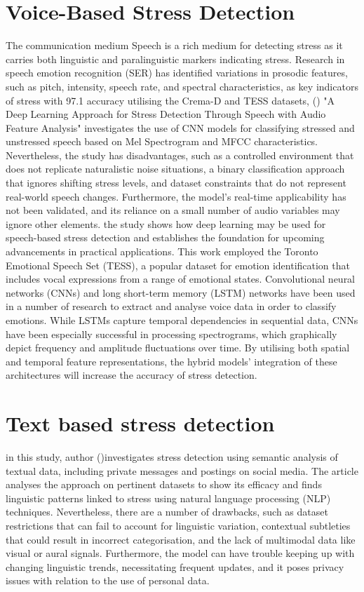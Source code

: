 \documentclass[Arial,12pt,openright,twoside]{book}
\begin{document}
  \section{Voice-Based Stress Detection}
  The communication medium Speech is a rich medium for detecting stress as it carries both linguistic and paralinguistic markers indicating stress. Research in speech emotion recognition (SER) has identified variations in prosodic features, such as pitch, intensity, speech rate, and spectral characteristics, as key indicators of stress with 97.1%
  accuracy utilising the Crema-D and TESS datasets, (\cite{chyan2022}) "A Deep Learning Approach for Stress Detection Through Speech with Audio Feature Analysis" investigates the use of CNN models for classifying stressed and unstressed speech based on Mel Spectrogram and MFCC characteristics. Nevertheless, the study has disadvantages, such as a controlled environment that does not replicate naturalistic noise situations, a binary classification approach that ignores shifting stress levels, and dataset constraints that do not represent real-world speech changes. Furthermore, the model's real-time applicability has not been validated, and its reliance on a small number of audio variables may ignore other elements. the study shows how deep learning may be used for speech-based stress detection and establishes the foundation for upcoming advancements in practical applications. 
This work employed the Toronto Emotional Speech Set (TESS), a popular dataset for emotion identification that includes vocal expressions from a range of emotional states. Convolutional neural networks (CNNs) and long short-term memory (LSTM) networks have been used in a number of research to extract and analyse voice data in order to classify emotions. While LSTMs capture temporal dependencies in sequential data, CNNs have been especially successful in processing spectrograms, which graphically depict frequency and amplitude fluctuations over time. By utilising both spatial and temporal feature representations, the hybrid models' integration of these architectures  will increase the accuracy of stress detection.
\section{Text based stress detection}
 in this study, author (\citet{yoon2020})investigates stress detection using semantic analysis of textual data, including private messages and postings on social media. The article analyses the approach on pertinent datasets to show its efficacy and finds linguistic patterns linked to stress using natural language processing (NLP) techniques. Nevertheless, there are a number of drawbacks, such as dataset restrictions that can fail to account for linguistic variation, contextual subtleties that could result in incorrect categorisation, and the lack of multimodal data like visual or aural signals. Furthermore, the model can have trouble keeping up with changing linguistic trends, necessitating frequent updates, and it poses privacy issues with relation to the use of personal data. 
\end{document}
